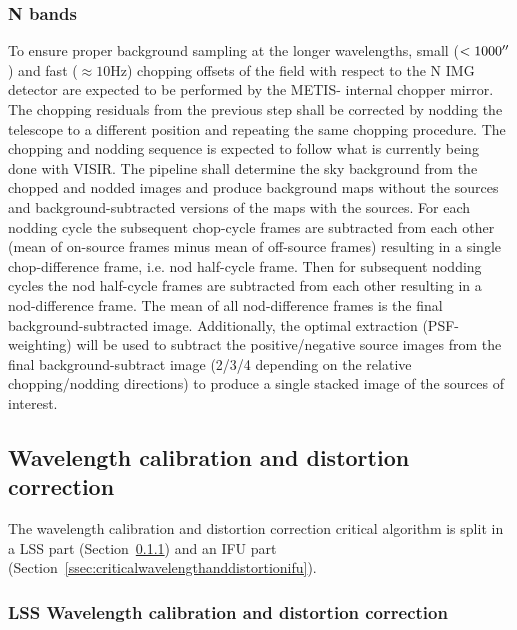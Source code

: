 \subsubsection{N bands}
To ensure proper background sampling at the longer wavelengths, small ($< 1000 \hbox{$^{\prime\prime}$}$) and fast ($\approx 10 \mathrm{Hz}$) chopping offsets of the field with respect to the N IMG detector are expected to be performed by the METIS- internal chopper mirror.
The chopping residuals from the previous step shall be corrected by nodding the telescope to a different position and repeating the same chopping procedure.
The chopping and nodding sequence is expected to follow what is currently being done with VISIR.
The pipeline shall determine the sky background from the chopped and nodded images and produce background maps without the sources and background-subtracted versions of the maps with the sources.
For each nodding cycle the subsequent chop-cycle frames are subtracted from each other (mean of on-source frames minus mean of off-source frames) resulting in a single chop-difference frame, i.e. nod half-cycle frame.
Then for subsequent nodding cycles the nod half-cycle frames are subtracted from each other resulting in a nod-difference frame.
The mean of all nod-difference frames is the final background-subtracted image.
Additionally, the optimal extraction (PSF-weighting) will be used to subtract the positive/negative source images from the final background-subtract image (2/3/4 depending on the relative chopping/nodding directions) to produce a single stacked image of the sources of interest.

\subsection{Wavelength calibration and distortion correction}\label{ssec:criticalwavelengthanddistortion}
The wavelength calibration and distortion correction critical algorithm is split in a LSS part (Section~\ref{ssec:criticalwavelengthanddistortionlss}) and an IFU part (Section~\ref{ssec:criticalwavelengthanddistortionifu}).

\subsubsection{LSS Wavelength calibration and distortion correction}\label{ssec:criticalwavelengthanddistortionlss}



